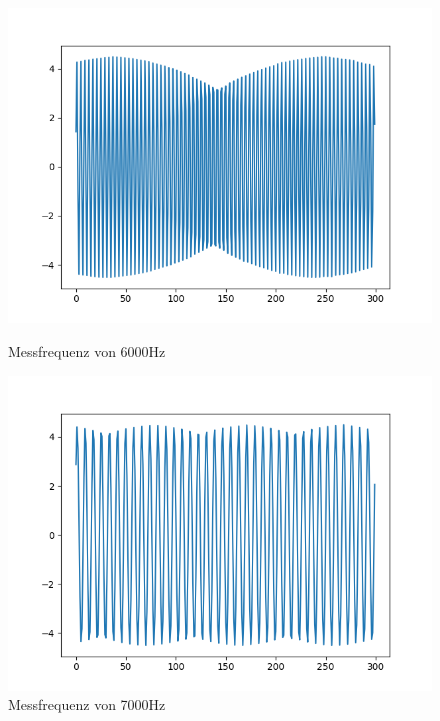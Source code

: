 \documentclass[12pt, oneside, a4paper, \docLanguage]{report}
\begin{document}
\begin{figure}[H]
   \begin{minipage}[b]{.5\linewidth} %
      \includegraphics[width=\linewidth]{media/6000Hz}
      \caption{Messfrequenz von  6000Hz}
   \end{minipage}
   \begin{minipage}[b]{.5\linewidth} %
      \includegraphics[width=\linewidth]{media/7000Hz}
      \caption{Messfrequenz von 7000Hz}
   \end{minipage}
\end{figure}
\end{document}
